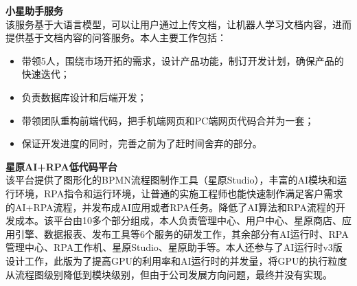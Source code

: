 \documentclass[a4paper]{article}
\newenvironment{changemargin}[2]{%
  \begin{list}{}{%
    \setlength{\topsep}{0pt}%
    \setlength{\leftmargin}{#1}%
    \setlength{\rightmargin}{#2}%
    \setlength{\listparindent}{\parindent}%
    \setlength{\itemindent}{\parindent}%
    \setlength{\parsep}{\parskip}%
  }%
  \item[]}{\end{list}
}
\newenvironment{body} {
	\vspace*{-16pt}
	\begin{changemargin}{-0.5in}{-0.5in}
  }	
	{\end{changemargin}
}
\begin{document}
\begin{body}
	\vspace{14pt}
  	\textbf{小星助手服务} \\
  	\smallskip
 	该服务基于大语言模型，可以让用户通过上传文档，让机器人学习文档内容，进而提供基于文档内容的问答服务。本人主要工作包括：
	\vspace*{-2pt}
	\begin{itemize} \itemsep -0pt  %
		\item 带领5人，围绕市场开拓的需求，设计产品功能，制订开发计划，确保产品的快速迭代；\\
	\end{itemize}
	\vspace*{-10pt}
	\begin{itemize} \itemsep -0pt  %
		\item 负责数据库设计和后端开发；\\
	\end{itemize}
	\vspace*{-10pt}
	\begin{itemize} \itemsep -0pt  %
		\item 带领团队重构前端代码，把手机端网页和PC端网页代码合并为一套；\\
	\end{itemize}
	\vspace*{-10pt}
	\begin{itemize} \itemsep -0pt  %
		\item 保证开发进度的同时，完善之前为了赶时间舍弃的部分。\\
	\end{itemize}
	
	\vspace{14pt}
  	\textbf{星原AI+RPA低代码平台} \\
  	\smallskip
 	该平台提供了图形化的BPMN流程图制作工具（星原Studio），丰富的AI模块和运行环境，RPA指令和运行环境，让普通的实施工程师也能快速制作满足客户需求的AI+RPA流程，并发布成AI应用或者RPA任务。降低了AI算法和RPA流程的开发成本。该平台由10多个部分组成，本人负责管理中心、用户中心、星原商店、应用引擎、数据报表、发布工具等6个服务的研发工作，其余部分有AI运行时、RPA管理中心、RPA工作机、星原Studio、星原助手等。本人还参与了AI运行时v3版设计工作，此版为了提高GPU的利用率和AI运行时的并发量，将GPU的执行粒度从流程图级别降低到模块级别，但由于公司发展方向问题，最终并没有实现。\\
	

\end{body}
\end{document}
